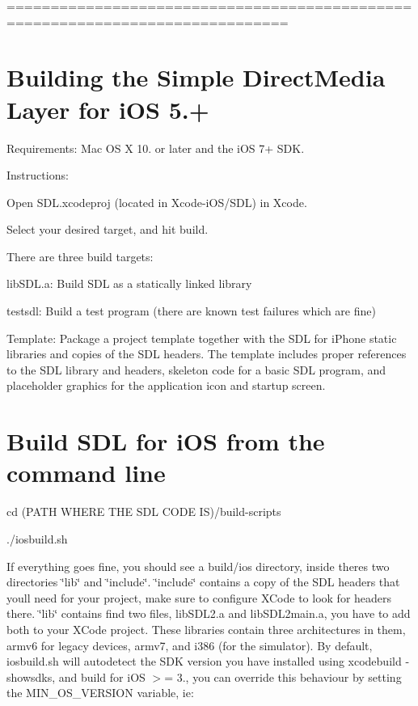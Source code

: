 ============================================================================== \section*{Building the Simple Direct\+Media Layer for i\+OS 5.+ }

Requirements\+: Mac OS X 10. or later and the i\+OS 7+ S\+DK.

Instructions\+:


\begin{DoxyEnumerate}
\item Open S\+D\+L.\+xcodeproj (located in Xcode-\/i\+O\+S/\+S\+DL) in Xcode.
\item Select your desired target, and hit build.
\end{DoxyEnumerate}

There are three build targets\+:
\begin{DoxyItemize}
\item lib\+S\+D\+L.\+a\+: Build S\+DL as a statically linked library
\item testsdl\+: Build a test program (there are known test failures which are fine)
\item Template\+: Package a project template together with the S\+DL for i\+Phone static libraries and copies of the S\+DL headers. The template includes proper references to the S\+DL library and headers, skeleton code for a basic S\+DL program, and placeholder graphics for the application icon and startup screen.
\end{DoxyItemize}



 \section*{Build S\+DL for i\+OS from the command line }


\begin{DoxyEnumerate}
\item cd (P\+A\+TH W\+H\+E\+RE T\+HE S\+DL C\+O\+DE IS)/build-\/scripts
\item ./iosbuild.sh
\end{DoxyEnumerate}

If everything goes fine, you should see a build/ios directory, inside there\textquotesingle{}s two directories \char`\"{}lib\char`\"{} and \char`\"{}include\char`\"{}. \char`\"{}include\char`\"{} contains a copy of the S\+DL headers that you\textquotesingle{}ll need for your project, make sure to configure X\+Code to look for headers there. \char`\"{}lib\char`\"{} contains find two files, lib\+S\+D\+L2.\+a and lib\+S\+D\+L2main.\+a, you have to add both to your X\+Code project. These libraries contain three architectures in them, armv6 for legacy devices, armv7, and i386 (for the simulator). By default, iosbuild.\+sh will autodetect the S\+DK version you have installed using xcodebuild -\/showsdks, and build for i\+OS $>$= 3., you can override this behaviour by setting the M\+I\+N\+\_\+\+O\+S\+\_\+\+V\+E\+R\+S\+I\+ON variable, ie\+:

